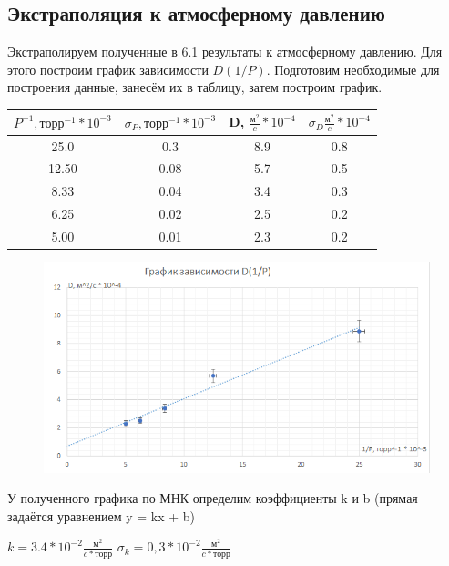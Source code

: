 \documentclass[12pt,a4paper]{article}
\begin{document}
\subsection{Экстраполяция к атмосферному давлению}

Экстраполируем полученные в 6.1 результаты к атмосферному давлению. Для этого построим график зависимости $ D(1/P) $. Подготовим необходимые для построения данные, занесём их в таблицу, затем построим график.

\begin{table}[H]
	\centering
	\begin{tabular}{|c|c|c|c|}
		\hline
		$P^{-1}, \text{торр}^{-1} * 10^{-3}$ & $\sigma_{P}, \text{торр}^{-1} * 10^{-3}$ & D, $\frac{\text{м}^2}{c} * 10^{-4}$ & $\sigma_{D}\frac{\text{м}^2}{c} * 10^{-4}$ \\ \hline
		25.0 & 0.3 & 8.9 & 0.8 \\ \hline
		12.50 & 0.08 & 5.7 & 0.5 \\ \hline
		8.33 & 0.04 & 3.4 & 0.3 \\ \hline
		6.25 & 0.02 & 2.5 & 0.2 \\ \hline
		5.00 & 0.01 & 2.3 & 0.2 \\ \hline
	\end{tabular}
\end{table}

\begin{figure}[H]
	\begin{center}
		\includegraphics[width=14cm]{2.2.1_gr_3}
	\end{center}
	\label{ris8}
\end{figure}

У полученного графика по МНК определим коэффициенты k и b (прямая задаётся уравнением y = kx + b)

$k = 3.4 * 10^{-2} \frac{\text{м}^2}{c * \text{торр}}$ \;\;\;\;\; $\sigma_{k} = 0,3 * 10^{-2} \frac{\text{м}^2}{c * \text{торр}}$ 
\end{document}
